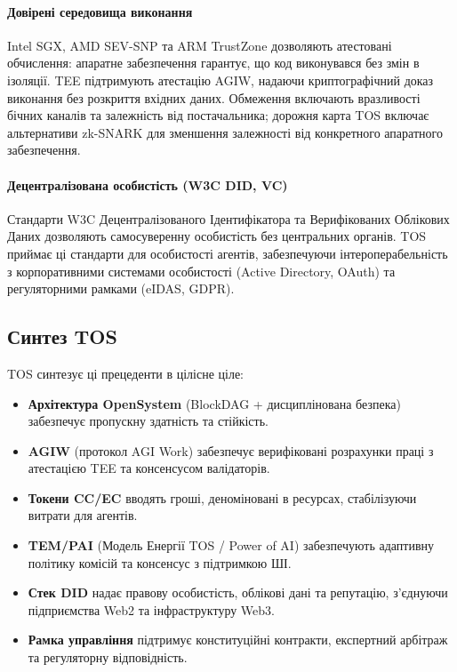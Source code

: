 \documentclass[11pt]{article}
\begin{document}
\paragraph{Довірені середовища виконання} Intel SGX, AMD SEV-SNP та ARM TrustZone дозволяють атестовані обчислення: апаратне забезпечення гарантує, що код виконувався без змін в ізоляції. TEE підтримують атестацію AGIW, надаючи криптографічний доказ виконання без розкриття вхідних даних. Обмеження включають вразливості бічних каналів та залежність від постачальника; дорожня карта TOS включає альтернативи zk-SNARK для зменшення залежності від конкретного апаратного забезпечення.

\paragraph{Децентралізована особистість (W3C DID, VC)} Стандарти W3C Децентралізованого Ідентифікатора та Верифікованих Облікових Даних дозволяють самосуверенну особистість без центральних органів. TOS приймає ці стандарти для особистості агентів, забезпечуючи інтероперабельність з корпоративними системами особистості (Active Directory, OAuth) та регуляторними рамками (eIDAS, GDPR).

\subsection{Синтез TOS}
TOS синтезує ці прецеденти в цілісне ціле:
\begin{itemize}[noitemsep]
  \item \textbf{Архітектура OpenSystem} (BlockDAG + дисциплінована безпека) забезпечує пропускну здатність та стійкість.
  \item \textbf{AGIW} (протокол AGI Work) забезпечує верифіковані розрахунки праці з атестацією TEE та консенсусом валідаторів.
  \item \textbf{Токени CC/EC} вводять гроші, деноміновані в ресурсах, стабілізуючи витрати для агентів.
  \item \textbf{TEM/PAI} (Модель Енергії TOS / Power of AI) забезпечують адаптивну політику комісій та консенсус з підтримкою ШІ.
  \item \textbf{Стек DID} надає правову особистість, облікові дані та репутацію, з'єднуючи підприємства Web2 та інфраструктуру Web3.
  \item \textbf{Рамка управління} підтримує конституційні контракти, експертний арбітраж та регуляторну відповідність.
\end{itemize}
\end{document}
